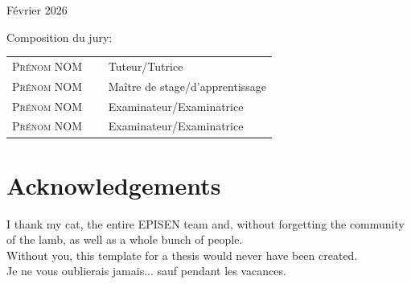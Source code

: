 \begin{titlepage}
\begin{center}
	
			
			\vspace{2cm}
	
			Février 2026
		\end{center}
		
		\vspace{1cm}
			
		\vfill
		Composition du jury:
		\begin{center}
			\begin{tabular}{ll}
				\textsc{Prénom NOM}   &  $\quad$ Tuteur/Tutrice\\
				\textsc{Prénom NOM}   &  $\quad$ Maître de stage/d'apprentissage\\
				\textsc{Prénom NOM}   &  $\quad$ Examinateur/Examinatrice\\
				\textsc{Prénom NOM}   &  $\quad$ Examinateur/Examinatrice\\
			\end{tabular}
		\end{center}
    
    \titlepagedecoration
	\newpage
	\thispagestyle{empty}
	\color{colorEPISEN-MEMOIRE}
	
	\section*{Acknowledgements}
	\color{black}
      I thank my cat, the entire EPISEN team and, without forgetting the community of the lamb, as well as a whole bunch of people. \\

	 Without you, this template for a thesis would never have been created.\\

	Je ne vous oublierais jamais... sauf pendant les vacances.
	\end{titlepage}
